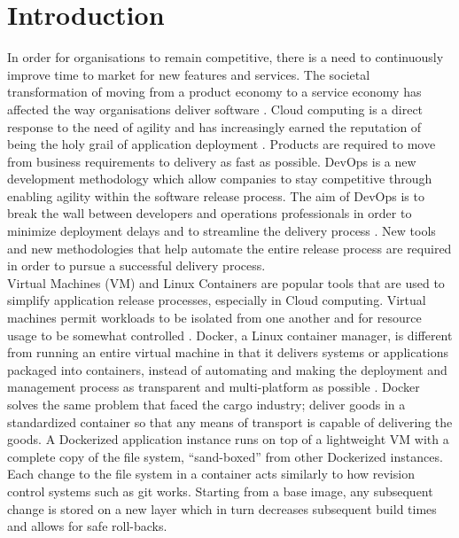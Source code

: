 \chapter{Introduction}
In order for organisations to remain competitive, there is a need to continuously improve time to market for new features and services. The societal transformation of moving from a product economy to a service economy has affected the way organisations deliver software \cite{mckinsey}. Cloud computing is a direct response to the need of agility and has increasingly earned the reputation of being the holy grail of application deployment \cite{7034713}. Products are required to move from business requirements to delivery as fast as possible. DevOps is a new development methodology which allow companies to stay competitive through enabling agility within the software release process. The aim of DevOps is to break the wall between developers and operations professionals in order to minimize deployment delays and to streamline the delivery process \cite{Httermann:2012:DD:2380958}. New tools and new methodologies that help automate the entire release process are required in order to pursue a successful delivery process.\\

Virtual Machines (VM) and Linux Containers are popular tools that are used to simplify application release processes, especially in Cloud computing. Virtual machines permit workloads to be isolated from one another and for resource usage to be somewhat controlled \cite{vmvscontainers}. Docker, a Linux container manager, is different from running an entire virtual machine in that it delivers systems or applications packaged into containers, instead of automating and making the deployment and management process as transparent and multi-platform as possible \cite{vmvscontainers}. Docker solves the same problem that faced the cargo industry; deliver goods in a standardized container so that any means of transport is capable of delivering the goods. A Dockerized application instance runs on top of a lightweight VM with a complete copy of the file system, “sand-boxed” from other Dockerized instances. Each change to the file system in a container acts similarly to how revision control systems such as git works. Starting from a base image, any subsequent change is stored on a new layer which in turn decreases subsequent build times and allows for safe roll-backs.\\

